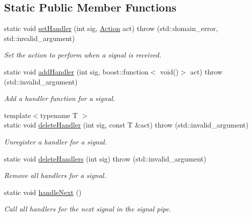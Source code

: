 \subsection*{\-Static \-Public \-Member \-Functions}
\begin{DoxyCompactItemize}
\item 
static void \hyperlink{classLibWheel_1_1SignalQueue_ac0145e9276c339fccebe3c0b70cec914}{set\-Handler} (int sig, \hyperlink{classLibWheel_1_1SignalQueue_a5a366bd8de3564c5e3001233464d20e3}{\-Action} act)  throw (std\-::domain\-\_\-error, std\-::invalid\-\_\-argument)
\begin{DoxyCompactList}\small\item\em \-Set the action to perform when a signal is received. \end{DoxyCompactList}\item 
static void \hyperlink{classLibWheel_1_1SignalQueue_ada6b998cee9ced93ac7e046199187fa6}{add\-Handler} (int sig, boost\-::function$<$ void()$>$ act)  throw (std\-::invalid\-\_\-argument)
\begin{DoxyCompactList}\small\item\em \-Add a handler function for a signal. \end{DoxyCompactList}\item 
{\footnotesize template$<$typename T $>$ }\\static void \hyperlink{classLibWheel_1_1SignalQueue_a16b57819e9a601533b9bff97ec08b5e5}{delete\-Handler} (int sig, const \-T \&act)  throw (std\-::invalid\-\_\-argument)
\begin{DoxyCompactList}\small\item\em \-Unregister a handler for a signal. \end{DoxyCompactList}\item 
static void \hyperlink{classLibWheel_1_1SignalQueue_afc29a5340fe52fd173e808f65f0ec3a7}{delete\-Handlers} (int sig)  throw (std\-::invalid\-\_\-argument)
\begin{DoxyCompactList}\small\item\em \-Remove all handlers for a signal. \end{DoxyCompactList}\item 
static void \hyperlink{classLibWheel_1_1SignalQueue_a991ba21066232f0db7be5f21e39edc41}{handle\-Next} ()
\begin{DoxyCompactList}\small\item\em \-Call all handlers for the next signal in the signal pipe. \end{DoxyCompactList}\item 

\end{DoxyCompactItemize}
